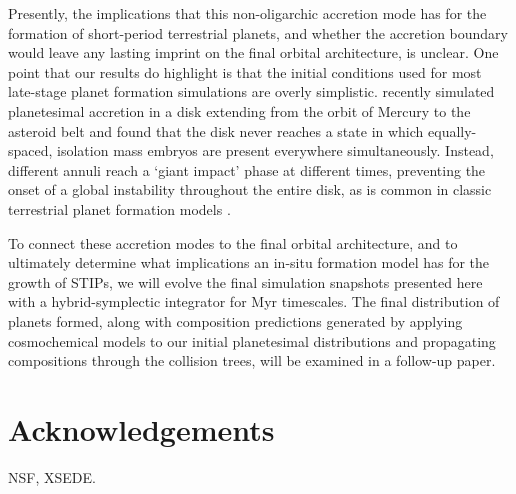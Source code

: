 \documentclass[twocolumn]{aastex63}
\begin{document}
Presently, the implications that this non-oligarchic accretion mode has for the formation of short-period terrestrial planets, and 
whether the accretion boundary would leave any lasting imprint on the final orbital architecture, is unclear. One point that our 
results do highlight is that the initial conditions used for most late-stage planet formation simulations are overly simplistic. 
\citet{clement20} recently simulated planetesimal accretion in a disk extending from the orbit of Mercury to the asteroid belt and 
found that the disk never reaches a state in which equally-spaced, isolation mass embryos are present everywhere 
simultaneously. Instead, different annuli reach a `giant impact' phase at different times, preventing the onset of a global instability 
throughout the entire disk, as is common in classic terrestrial planet formation models \citep{chambers01, raymond09}.

To connect these accretion modes to the final orbital architecture,
and to ultimately determine what implications an in-situ formation model has for the growth of STIPs, we will evolve the final 
simulation snapshots presented here with a hybrid-symplectic integrator for Myr timescales. The final distribution of planets 
formed, along with composition predictions generated by applying cosmochemical models to our initial planetesimal distributions 
and propagating compositions through the collision trees, will be examined in a follow-up paper.

\section{Acknowledgements}

NSF, XSEDE.



\clearpage
\end{document}
